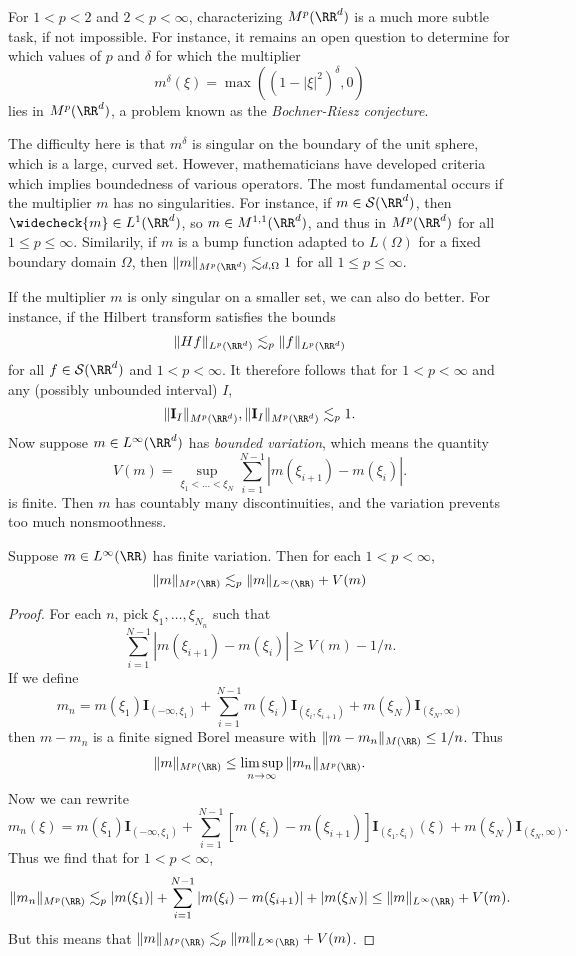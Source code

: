 For $1 < p < 2$ and $2 < p < \infty$, characterizing $M^p(\RR^d)$ is a much more subtle task, if not impossible. For instance, it remains an open question to determine for which values of $p$ and $\delta$ for which the multiplier
%
\[ m^\delta(\xi) = \max((1 - |\xi|^2)^\delta,0) \]
%
lies in $M^p(\RR^d)$, a problem known as the \emph{Bochner-Riesz conjecture}.

The difficulty here is that $m^\delta$ is singular on the boundary of the unit sphere, which is a large, curved set. However, mathematicians have developed criteria which implies boundedness of various operators. The most fundamental occurs if the multiplier $m$ has no singularities. For instance, if $m \in \mathcal{S}(\RR^d)$, then $\widecheck{m} \in L^1(\RR^d)$, so $m \in M^{1,1}(\RR^d)$, and thus in $M^p(\RR^d)$ for all $1 \leq p \leq \infty$. Similarily, if $m$ is a bump function adapted to $L(\Omega)$ for a fixed boundary domain $\Omega$, then $\| m \|_{M^p(\RR^d)} \lesssim_{d,\Omega} 1$ for all $1 \leq p \leq \infty$.

If the multiplier $m$ is only singular on a smaller set, we can also do better. For instance, if the Hilbert transform satisfies the bounds
%
\[ \| Hf \|_{L^p(\RR^d)} \lesssim_p \| f \|_{L^p(\RR^d)} \]
%
for all $f \in \mathcal{S}(\RR^d)$ and $1 < p < \infty$. It therefore follows that for $1 < p < \infty$ and any (possibly unbounded interval) $I$,
%
\[ \| \mathbf{I}_{I} \|_{M^p(\RR^d)}, \| \mathbf{I}_{I} \|_{M^p(\RR^d)} \lesssim_p 1. \]
%
Now suppose $m \in L^\infty(\RR^d)$ has \emph{bounded variation}, which means the quantity
%
\[ V(m) = \sup_{\xi_1 < \dots < \xi_N} \sum_{i = 1}^{N-1} |m(\xi_{i+1}) - m(\xi_i)|. \]
%
is finite. Then $m$ has countably many discontinuities, and the variation prevents too much nonsmoothness.

\begin{theorem}
  Suppose $m \in L^\infty(\RR)$ has finite variation. Then for each $1 < p < \infty$,
  \[ \| m \|_{M^p(\RR)} \lesssim_p \| m \|_{L^\infty(\RR)} + V(m) \]
\end{theorem}
\begin{proof}
  For each $n$, pick $\xi_1,\dots,\xi_{N_n}$ such that
  \[ \sum_{i = 1}^{N-1} |m(\xi_{i+1}) - m(\xi_i)| \geq V(m) - 1/n. \]
  If we define
  \[ m_n = m(\xi_1) \mathbf{I}_{(-\infty,\xi_1)} + \sum_{i = 1}^{N-1} m(\xi_i) \mathbf{I}_{(\xi_i,\xi_{i+1})} + m(\xi_N) \mathbf{I}_{(\xi_N,\infty)} \]
  then $m - m_n$ is a finite signed Borel measure with $\| m - m_n \|_{M(\RR)} \leq 1/n$. Thus
  \[ \| m \|_{M^p(\RR)} \leq \limsup_{n \to \infty} \| m_n \|_{M^p(\RR)}. \]
  Now we can rewrite
  \[ m_n(\xi) = m(\xi_1) \mathbf{I}_{(-\infty,\xi_1)} + \sum_{i = 1}^{N-1} [m(\xi_i) - m(\xi_{i+1})] \mathbf{I}_{(\xi_1,\xi_i)}(\xi) + m(\xi_N) \mathbf{I}_{(\xi_N,\infty)}. \]
  Thus we find that for $1 < p < \infty$,
  \[ \| m_n \|_{M^p(\RR)} \lesssim_p |m(\xi_1)| + \sum_{i = 1}^{N-1} |m(\xi_i) - m(\xi_{i+1})| + |m(\xi_N)| \leq \| m \|_{L^\infty(\RR)} + V(m). \]
  But this means that $\| m \|_{M^p(\RR)} \lesssim_p \| m \|_{L^\infty(\RR)} + V(m)$.
\end{proof}

